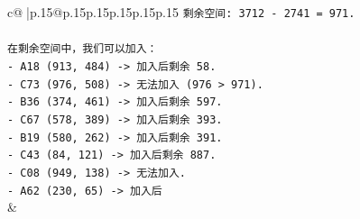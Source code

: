 \documentclass{article}
\begin{document}
{\begin{supertabular}{c@{$\;$}|p{.15\linewidth}@{}p{.15\linewidth}p{.15\linewidth}p{.15\linewidth}p{.15\linewidth}p{.15\linewidth}}
{{{\texttt{剩余空间: 3712 {-} 2741 = 971.} \\
\\ 
\texttt{在剩余空间中，我们可以加入：} \\
\texttt{{-} A18 (913, 484) {-}> 加入后剩余 58.} \\
\texttt{{-} C73 (976, 508) {-}> 无法加入 (976 > 971).} \\
\texttt{{-} B36 (374, 461) {-}> 加入后剩余 597.} \\
\texttt{{-} C67 (578, 389) {-}> 加入后剩余 393.} \\
\texttt{{-} B19 (580, 262) {-}> 加入后剩余 391.} \\
\texttt{{-} C43 (84, 121) {-}> 加入后剩余 887.} \\
\texttt{{-} C08 (949, 138) {-}> 无法加入.} \\
\texttt{{-} A62 (230, 65) {-}> 加入后} \\
            }
        }
    }
    & \\ \\


\end{supertabular}}
\end{document}
